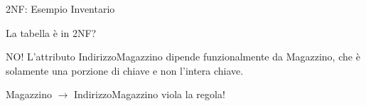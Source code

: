 \begin{frame}{2NF: Esempio Inventario}
\vspace{-0.7cm}
\InventarioModifiedPK
\vspace{.2cm}

La tabella \`e in 2NF?
\vspace{.2cm}
\pause

\begin{minipage}{0.7\textwidth}
NO! L'attributo IndirizzoMagazzino dipende funzionalmente da Magazzino, che \`e solamente una porzione di chiave e non l'intera chiave.

Magazzino $ \rightarrow $ IndirizzoMagazzino viola la regola!
\end{minipage}
\end{frame}
%
